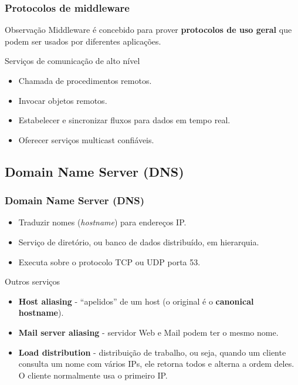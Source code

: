 \documentclass[xcolor=dvipsnames,10pt,compress,aspectratio=169]{beamer}
\begin{document}
\begin{frame}
  \frametitle{Protocolos de middleware}
  \begin{block}{Observação}
  Middleware é concebido para prover \textbf{protocolos de uso geral} que podem ser usados por 
  diferentes aplicações.
  \end{block}
  \begin{exampleblock}{Serviços de comunicação de alto nível}
    \begin{itemize}
    \item Chamada de procedimentos remotos.
    \item Invocar objetos remotos.
    \item Estabelecer e sincronizar fluxos para dados em tempo real.
    \item Oferecer serviços multicast confiáveis.
    \end{itemize}
  \end{exampleblock}
\end{frame}

\subsection{Domain Name Server (DNS)}

\begin{frame}
  \frametitle{Domain Name Server (DNS)}
  \begin{itemize}
  \item Traduzir nomes (\emph{hostname}) para endereços IP.
  \item Serviço de diretório, ou banco de dados distribuído, em hierarquia.
  \item Executa sobre o protocolo TCP ou UDP porta 53.
  \end{itemize}
  \pause 
  \begin{exampleblock}{Outros serviços}
    \begin{itemize}
    \item {\bf Host aliasing} - ``apelidos'' de um host (o original é o \textbf{canonical hostname}).
    \item {\bf Mail server aliasing} - servidor Web e Mail podem ter o mesmo nome.
    \item {\bf Load distribution} - distribuição de trabalho, ou seja, quando um cliente consulta
    um nome com vários IPs, ele retorna todos e alterna a ordem deles. O cliente normalmente usa o
    primeiro IP.
    \end{itemize}
  \end{exampleblock}
\end{frame}
\end{document}

